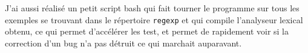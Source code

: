 \documentclass[12pt, a4paper]{article}
\begin{document}
J'ai aussi réalisé un petit script bash qui fait tourner le programme sur tous les exemples se trouvant dans le répertoire \texttt{regexp} et qui compile l'analyseur lexical obtenu, ce qui permet d’accélérer les test, et permet de rapidement voir si la correction d'un bug n'a pas détruit ce qui marchait auparavant.
\end{document}
